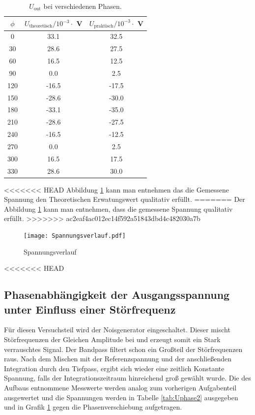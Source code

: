 \begin{table}
  \centering
  \begin{tabular}{c c c}
    \toprule
    $\phi$ & $U_{\text{theoretisch}} / 10^{-3} \cdot $ V & $U_{\text{praktisch}} / 10^{-3} \cdot $ V \\
    \midrule
    0	  &  33.1  &  32.5	\\
    30	&  28.6  &  27.5	\\
    60	&  16.5  &  12.5	\\
    90	&  0.0 	 &   2.5	\\
    120	& -16.5  & -17.5	\\
    150	& -28.6  & -30.0	\\
    180	& -33.1  & -35.0	\\
    210	& -28.6  & -27.5	\\
    240	& -16.5  & -12.5	\\
    270	&  0.0 	 &  2.5	 	\\
    300	&  16.5  &  17.5	\\
    330	&  28.6	 &  30.0	\\
  \end{tabular}
  \caption{$U_{\text{out}}$ bei verschiedenen Phasen.}
  \label{tab:Uphase}
\end{table}
<<<<<<< HEAD
Abbildung \ref{fig:Spannungsverlauf} kann man entnehmen das die Gemessene Spannung den Theoretischen Erwatungswert qualitativ erfüllt.
=======
Der Abbildung \ref{fig:Spannungsverlauf} kann man entnehmen, dass die gemessene Spannung qualitativ erfüllt. %
>>>>>>> ac2eaf4ac012ec14f592a51843dbd4c482030a7b
\begin{figure}
  \centering
  \texttt{[image: Spannungsverlauf.pdf]}
  \caption{Spannungsverlauf}
  \label{fig:Spannungsverlauf}
\end{figure}
<<<<<<< HEAD
\subsection{Phasenabhängigkeit der Ausgangsspannung unter Einfluss einer Störfrequenz}
Für diesen Versuchsteil wird der Noisgenerator eingeschaltet. Dieser mischt Störfrequenzen der Gleichen Amplitude bei und erzeugt somit ein Stark verrauschtes Signal. Der Bandpass filtert schon ein Großteil der Störfrequenzen raus. Nach dem Mischen mit der Referenzspannung und der anschließenden Integration durch den Tiefpass, ergibt sich wieder eine zeitlich Konstante Spannung, falls der Integrationszeitraum hinreichend groß gewählt wurde. Die des Aufbaus entnommene Messwerte werden analog zum vorherigen Aufgabenteil ausgewertet und die Spannungen werden in Tabelle \ref{tab:Uphase2} ausgegeben und in Grafik \ref{fig:Spannungsverlauf} gegen die Phasenverschiebung aufgetragen.

